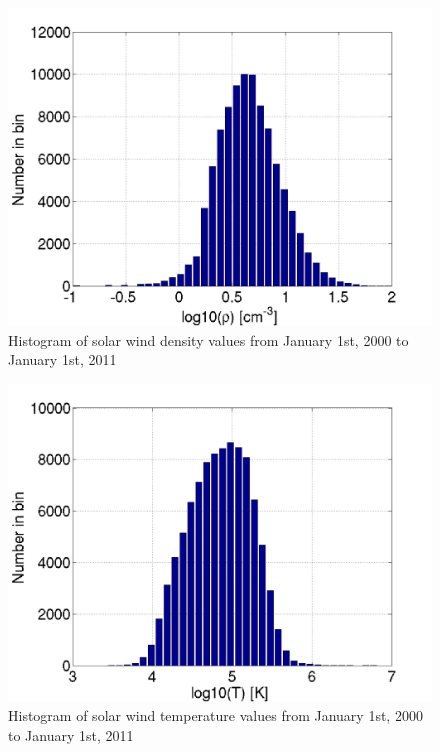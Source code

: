 \begin{figure}
	\centering
	\includegraphics[scale=0.5]{images/hist_N.png}
	\caption{Histogram of solar wind density values from January 1st, 2000 to
	January 1st, 2011}
    \label{fig:hist_n}
	\figSpace
\end{figure}
\begin{figure}
	\centering
	\includegraphics[scale=0.5]{images/hist_T.png}
	\caption{Histogram of solar wind temperature values from January 1st, 2000 to
	January 1st, 2011}
    \label{fig:hist_t}
	\figSpace
\end{figure}
